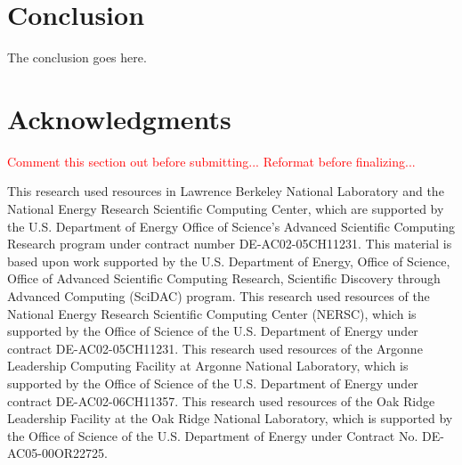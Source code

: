 \documentclass[conference]{IEEEtran}
\newcommand{\fix}[1]{\textcolor{red}{#1}}
\begin{document}
\section{Conclusion}
The conclusion goes here.


\section*{Acknowledgments}
\fix{Comment this section out before submitting... Reformat before finalizing...}

This research used resources in Lawrence Berkeley National Laboratory and the National Energy Research Scientific Computing Center, which are supported by the U.S. Department of Energy Office of Science's Advanced Scientific Computing Research program under contract number DE-AC02-05CH11231.  
This material is based upon work supported by the U.S. Department of Energy, Office of Science, Office of Advanced Scientific Computing Research, Scientific Discovery through Advanced Computing (SciDAC) program.
This research used resources of the National Energy Research Scientific Computing Center (NERSC), which is supported by the Office of Science of the U.S. Department of Energy under contract DE-AC02-05CH11231.
This research used resources of the Argonne Leadership Computing Facility at Argonne National Laboratory, which is supported by the Office of Science of the U.S. Department of Energy under contract DE-AC02-06CH11357.
This research used resources of the Oak Ridge Leadership Facility at the Oak Ridge National Laboratory, which is supported by the Office of Science of the U.S. Department of Energy under Contract No. DE-AC05-00OR22725.






\end{document}
